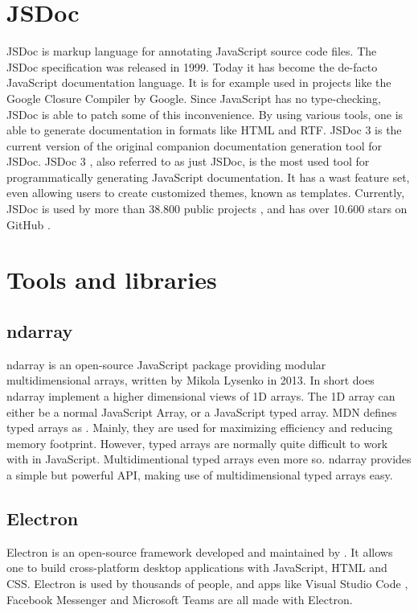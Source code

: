 \section{JSDoc}
JSDoc is markup language for annotating JavaScript source code files. The JSDoc specification was released in 1999. Today it has become the de-facto JavaScript documentation language. It is for example used in projects like the Google Closure Compiler \cite{google-closure-compiler} by Google. Since JavaScript has no type-checking, JSDoc is able to patch some of this inconvenience. By using various tools, one is able to generate documentation in formats like HTML and RTF. JSDoc 3 is the current version of the original companion documentation generation tool for JSDoc. JSDoc 3 \cite{jsdoc-3}, also referred to as just JSDoc, is the most used tool for programmatically generating JavaScript documentation. It has a wast feature set, even allowing users to create customized themes, known as templates. Currently, JSDoc is used by more than 38.800 public projects \cite{jsdoc-used-by}, and has over 10.600 stars on GitHub \cite{jsdoc-stargazers}.

\section{Tools and libraries}
\subsection{ndarray}
ndarray is an open-source JavaScript package providing modular multidimensional arrays, written by Mikola Lysenko in 2013. In short does ndarray implement a higher dimensional views of 1D arrays. The 1D array can either be a normal JavaScript  Array, or a JavaScript typed array. MDN defines typed arrays as . Mainly, they are used for maximizing efficiency and reducing memory footprint. However, typed arrays are normally quite difficult to work with in JavaScript. Multidimentional typed arrays even more so. ndarray provides a simple but powerful API, making use of multidimensional typed arrays easy.

\subsection{Electron}
Electron \cite{electron} is an open-source framework developed and maintained by \citet{github}. It allows one to build cross-platform desktop applications with JavaScript, HTML and CSS. Electron is used by thousands of people, and apps like Visual Studio Code \cite{visual-studio-code}, Facebook Messenger \cite{messenger} and Microsoft Teams \cite{teams} are all made with Electron.

